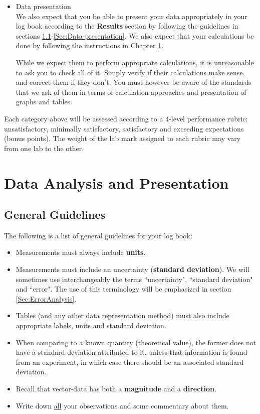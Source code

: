 \documentclass[12pt]{report}
\def\anhkhoi#1{{\color{purple}[#1]}}
\begin{document}
\begin{itemize}
\item Data presentation \\
We also expect that you be able to present your data appropriately in your log book according to the \textbf{Results} section by following the guidelines in sections \ref{Sec:General-guidelines}-\ref{Sec:Data-presentation}. We also expect that your calculations be done  by following the instructions in Chapter \ref{Ch:Data-analysis}.

\begin{tcolorbox}
While we expect them to perform appropriate calculations, it is unreasonable to ask you to check all of it. Simply verify if their calculations make sense, and correct them if they don't. You must however be aware of the standards that we ask of them in terms of calculation approaches and presentation of graphs and tables.
\end{tcolorbox}

\end{itemize}

Each category above will be assessed according to a 4-level performance rubric: unsatisfactory, minimally satisfactory, satisfactory and exceeding expectations (bonus points). The weight of the lab mark assigned to each rubric may vary from one lab to the other.


\chapter{Data Analysis and Presentation}
\label{Ch:Data-analysis}

\section{General Guidelines}
\label{Sec:General-guidelines}
The following is a list of general guidelines for your log book:
\begin{itemize}
\item Measurements must always include \textbf{units}.
\item Measurements must include an uncertainty (\textbf{standard deviation}). We will sometimes use interchangeably the terms ``uncertainty", ``standard deviation" and ``error". The use of this terminology will be emphasized in section \ref{Sec:ErrorAnalysis}.
\item Tables (and any other data representation method) must also include appropriate labels, units and standard deviation.
\item When comparing to a known quantity (theoretical value), the former does not have a standard deviation attributed to it, unless that information is found from an experiment, in which case there should be an associated standard deviation.
\item Recall that vector-data has both a \textbf{magnitude} and a \textbf{direction}.
\item Write down \underline{all} your observations and some commentary about them.
\end{itemize}
\end{document}
